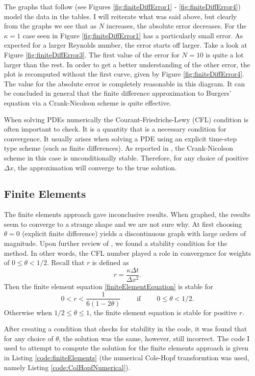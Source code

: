 \documentclass[undefended]{sfuthesis}
\begin{document}
The graphs that follow (see Figures \ref{fig:finiteDiffError1} - \ref{fig:finiteDiffError4}) model the data in the tables. I will reiterate what was said above, but clearly from the graphs we see that as $N$ increases, the absolute error decreases. For the $\kappa = 1$ case seen in Figure \ref{fig:finiteDiffError1} has a particularly small error. As expected for a larger Reynolds number, the error starts off larger. Take a look at Figure \ref{fig:finiteDiffError3}. The first value of the error for $N = 10$ is quite a lot larger than the rest. In order to get a better understanding of the other error, the plot is recomputed without the first curve, given by Figure \ref{fig:finiteDiffError4}. The value for the absolute error is completely reasonable in this diagram. It can be concluded in general that the finite difference approximation to Burgers' equation via a Crank-Nicolson scheme is quite effective.

When solving PDEs numerically the Courant-Friedrichs-Lewy (CFL) condition is often important to check. It is a quantity that is a necessary condition for convergence. It usually arises when solving a PDE using an explicit time-step type scheme (such as finite differences). As reported in \cite{burgerCrankNicolson}, the Crank-Nicolson scheme in this case is unconditionally stable. Therefore, for any choice of positive $\Delta x$, the approximation will converge to the true solution.

\subsection{Finite Elements}

The finite elements approach gave inconclusive results. When graphed, the results seem to converge to a strange shape and we are not sure why. At first choosing $\theta = 0$ (explicit finite difference) yields a discontinuous graph with large orders of magnitude. Upon further review of \cite{burgerFiniteElement}, we found a stability condition for the method. In other words, the CFL number played a role in convergence for weights of $0 \leq \theta < 1/2$. Recall that $r$ is defined as \[r = \frac{\kappa \Delta t}{\Delta x^2}.\] Then the finite element equation \eqref{finiteElementEquation} is stable for \[0 < r < \frac{1}{6(1 - 2 \theta)} \quad\quad \text{ if } \quad\quad 0 \leq \theta < 1/2.\] Otherwise when $1/2 \leq \theta \leq 1$, the finite element equation is stable for positive $r$.

After creating a condition that checks for stability in the code, it was found that for any choice of $\theta$, the solution was the same, however, still incorrect. The code I used to attempt to compute the solution for the finite elements approach is given in Listing \ref{code:finiteElements} (the numerical Cole-Hopf transformtion was used, namely Listing \ref{code:ColHopfNumerical}).
\end{document}
